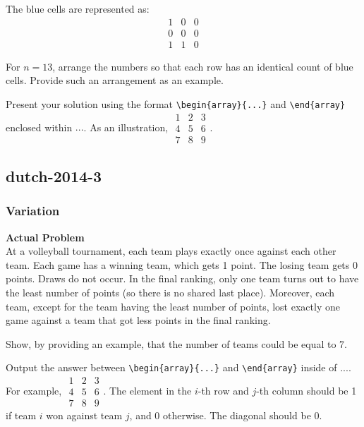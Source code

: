 The blue cells are represented as:
$$\begin{array}{ccc}
1 & 0 & 0 \\
0 & 0 & 0 \\
1 & 1 & 0
\end{array}$$

For \( n = 13 \), arrange the numbers so that each row has an identical count of blue cells. Provide such an arrangement as an example.

Present your solution using the format \verb|\begin{array}{...}| and \verb|\end{array}| enclosed within $\boxed{...}$. As an illustration, $\boxed{\begin{array}{ccc}1 & 2 & 3 \\ 4 & 5 & 6 \\ 7 & 8 & 9\end{array}}$.

\subsection{dutch-2014-3}
\subsubsection{Variation}
\textbf{Actual Problem}\\
At a volleyball tournament, each team plays exactly once against each other team. Each game has a winning team, which gets 1 point. The losing team gets 0 points. Draws do not occur. In the final ranking, only one team turns out to have the least number of points (so there is no shared last place). Moreover, each team, except for the team having the least number of points, lost exactly one game against a team that got less points in the final ranking.

Show, by providing an example, that the number of teams could be equal to 7.

Output the answer between \verb|\begin{array}{...}| and \verb|\end{array}| inside of $\boxed{...}$. For example, $\boxed{\begin{array}{ccc}1 & 2 & 3 \\ 4 & 5 & 6 \\ 7 & 8 & 9\end{array}}$.
The element in the $i$-th row and $j$-th column should be 1 if team $i$ won against team $j$, and 0 otherwise. The diagonal should be 0.

